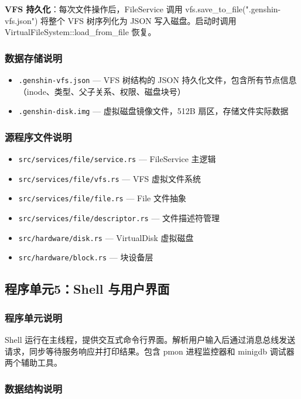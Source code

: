 \documentclass[UTF8,a4paper,12pt]{ctexart}
\begin{document}
\textbf{VFS 持久化}：每次文件操作后，FileService 调用 vfs.save\_to\_file(".genshin-vfs.json") 将整个 VFS 树序列化为 JSON 写入磁盘。启动时调用 VirtualFileSystem::load\_from\_file 恢复。

\subsubsection{数据存储说明}

\begin{itemize}
    \item \texttt{.genshin-vfs.json} — VFS 树结构的 JSON 持久化文件，包含所有节点信息（inode、类型、父子关系、权限、磁盘块号）
    \item \texttt{.genshin-disk.img} — 虚拟磁盘镜像文件，512B 扇区，存储文件实际数据
\end{itemize}

\subsubsection{源程序文件说明}

\begin{itemize}
    \item \texttt{src/services/file/service.rs} — FileService 主逻辑
    \item \texttt{src/services/file/vfs.rs} — VFS 虚拟文件系统
    \item \texttt{src/services/file/file.rs} — File 文件抽象
    \item \texttt{src/services/file/descriptor.rs} — 文件描述符管理
    \item \texttt{src/hardware/disk.rs} — VirtualDisk 虚拟磁盘
    \item \texttt{src/hardware/block.rs} — 块设备层
\end{itemize}

\subsection{程序单元5：Shell 与用户界面}

\subsubsection{程序单元说明}

Shell 运行在主线程，提供交互式命令行界面。解析用户输入后通过消息总线发送请求，同步等待服务响应并打印结果。包含 pmon 进程监控器和 minigdb 调试器两个辅助工具。

\subsubsection{数据结构说明}
\end{document}
